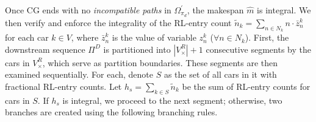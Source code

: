 \documentclass[12pt]{article}
\begin{document}
Once CG ends with no \textit{incompatible paths} in $\Omega^{\prime}_{\pi_d}$, the makespan $\widehat{m}$ is integral. We then verify and enforce the integrality of the RL-entry count $\widetilde{n}_k=\sum_{n\in N_k}{n\cdot \bar{z}^k_n}$ for each car $k\in V$, where $\bar{z}^k_n$ is the value of variable $z^k_n$ ($\forall n\in N_k$). First, the downstream sequence $\Pi^{D}$ is partitioned into $|V^{R}_{\times}|+1$ consecutive segments by the cars in $V^{R}_{\times}$, which serve as partition boundaries. These segments are then examined sequentially. For each, denote $S$ as the set of all cars in it with fractional RL-entry counts. %
Let $h_s=\sum_{k\in S}{\widetilde{n}_k}$ be the sum of RL-entry counts for cars in $S$. If $h_s$ is integral, we proceed to the next segment; otherwise, two branches are created using the following branching rules.

\end{document}
